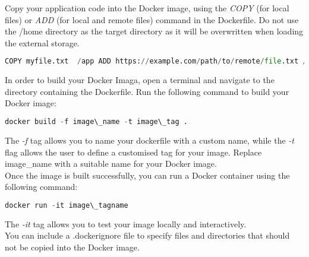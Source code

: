 Copy your application code into the Docker image, using the \textit{COPY} (for
local files) or \textit{ADD} (for local and remote files) command in the
Dockerfile. Do not use the /home directory as the target directory as it will be
overwritten when loading the external storage.

\begin{lstlisting}[language=python]
  COPY myfile.txt  /app ADD https://example.com/path/to/remote/file.txt /app/
\end{lstlisting}

In order to build your Docker Imaga, open a terminal and navigate to the
directory containing the Dockerfile. Run the following command to build your
Docker image:

\begin{lstlisting}[language=python]
    docker build -f image\_name -t image\_tag .
\end{lstlisting}

The \textit{-f} tag allows you to name your dockerfile with a custom name, while
the \textit{-t}  flag allows the user to define a customised tag for your image.
Replace image\_name with a suitable name for your Docker image. \\

Once the image is built successfully, you can run a Docker container using the
following command:

\begin{lstlisting}[language=python]
    docker run -it image\_tagname 
\end{lstlisting}

The \textit{-it} tag allows you to test your image locally and interactively. \\

You can include a .dockerignore file to specify files and directories that
should not be copied into the Docker image.